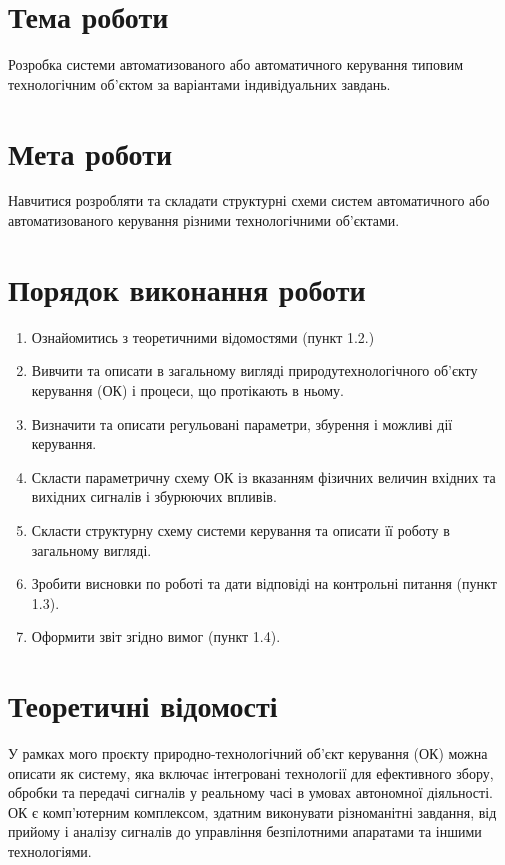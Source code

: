 \documentclass[a4paper]{article}
\begin{document}
\section*{Тема роботи}
Розробка системи автоматизованого
або автоматичного керування 
типовим технологічним об’єктом 
за варіантами індивідуальних завдань.

\section*{Мета роботи}
Навчитися розробляти та складати структурні схеми
систем автоматичного або автоматизованого керування різними
технологічними об'єктами.

\section*{Порядок виконання роботи}
\begin{enumerate}
    \item Ознайомитись з теоретичними відомостями (пункт 1.2.)
    \item Вивчити та описати в загальному вигляді природутехнологічного об’єкту керування (ОК) і процеси, що протікають в ньому.
    \item Визначити та описати регульовані параметри, збурення і можливі дії керування.
    \item Скласти параметричну схему ОК із вказанням фізичних величин вхідних та вихідних сигналів і збурюючих впливів.
    \item Скласти структурну схему системи керування та описати її роботу в загальному вигляді.
    \item Зробити висновки по роботі та дати відповіді на контрольні питання (пункт 1.3).
    \item Оформити звіт згідно вимог (пункт 1.4).
\end{enumerate}

\newpage

\section*{Теоретичні відомості}

У рамках мого проєкту природно-технологічний об’єкт керування (ОК) можна описати як систему, яка включає інтегровані технології для ефективного збору, обробки та передачі сигналів у реальному часі в умовах автономної діяльності. ОК є комп'ютерним комплексом, здатним виконувати різноманітні завдання, від прийому і аналізу сигналів до управління безпілотними апаратами та іншими технологіями.
\end{document}
